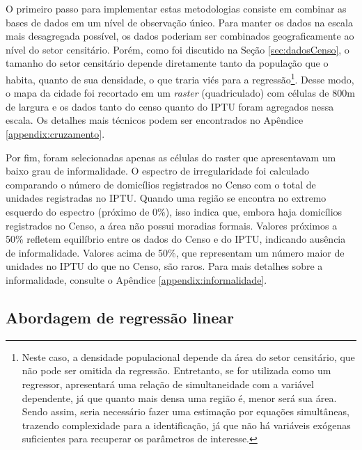 O primeiro passo para implementar estas metodologias consiste em combinar as bases de dados em um nível de observação único. Para manter os dados na escala mais desagregada possível, os dados poderiam ser combinados geograficamente ao nível do setor censitário. Porém, como foi discutido na Seção \ref{sec:dadosCenso}, o tamanho do setor censitário depende diretamente tanto da população que o habita, quanto de sua densidade, o que traria viés para a regressão\footnote{Neste caso, a densidade populacional depende da área do setor censitário, que não pode ser omitida da regressão. Entretanto, se for utilizada como um regressor, apresentará uma relação de simultaneidade com a variável dependente, já que quanto mais densa uma região é, menor será sua área. Sendo assim, seria necessário fazer uma estimação por equações simultâneas, trazendo complexidade para a identificação, já que não há variáveis exógenas suficientes para recuperar os parâmetros de interesse.}. Desse modo, o mapa da cidade foi recortado em um \textit{raster} (quadriculado) com células de 800m de largura e os dados tanto do censo quanto do IPTU foram agregados nessa escala. Os detalhes mais técnicos podem ser encontrados no Apêndice \ref{appendix:cruzamento}. 

Por fim, foram selecionadas apenas as células do raster que apresentavam um baixo grau de informalidade. O espectro de irregularidade foi calculado comparando o número de domicílios registrados no Censo com o total de unidades registradas no IPTU. Quando uma região se encontra no extremo esquerdo do espectro (próximo de 0\%), isso indica que, embora haja domicílios registrados no Censo, a área não possui moradias formais. Valores próximos a 50\% refletem equilíbrio entre os dados do Censo e do IPTU, indicando ausência de informalidade. Valores acima de 50\%, que representam um número maior de unidades no IPTU do que no Censo, são raros. Para mais detalhes sobre a informalidade, consulte o Apêndice \ref{appendix:informalidade}. 

\subsection{Abordagem de regressão linear}
\label{subsec:reglin}

{\tiny

}

